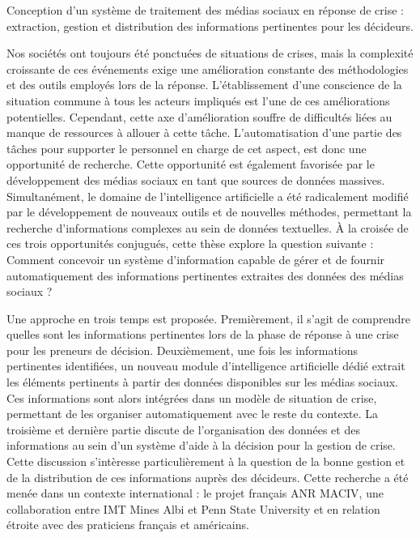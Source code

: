 \cleardoublepage
\pagestyle{empty}
\null
\newpage
{}%
{Conception d'un système de traitement des médias sociaux en réponse de crise : extraction, gestion et distribution des informations pertinentes pour les décideurs.}%
{
  Nos sociétés ont toujours été ponctuées de situations de crises, mais la complexité croissante de ces
  événements exige une amélioration constante des méthodologies et des outils employés lors de la réponse.
  L'établissement d'une conscience de la situation commune à tous les acteurs impliqués est l'une de ces améliorations
  potentielles.
  Cependant, cette axe d'amélioration souffre de difficultés liées au manque de ressources à allouer à cette tâche.
  L'automatisation d'une partie des tâches pour supporter le personnel en charge de cet aspect, est donc une opportunité de recherche.
  Cette opportunité est également favorisée par le développement des médias sociaux en tant que sources de données massives.
  Simultanément, le domaine de l'intelligence artificielle a été radicalement modifié par
  le développement de nouveaux outils et de nouvelles méthodes, permettant la recherche
  d'informations complexes au sein de données textuelles.
  À la croisée de ces trois opportunités conjugués, cette thèse explore la question suivante :
  Comment concevoir un système d'information capable de gérer et de fournir automatiquement
  des informations pertinentes extraites des données des médias sociaux ?

  Une approche en trois temps est proposée. Premièrement, il s'agit de comprendre
  quelles sont les informations pertinentes lors de la phase de réponse à une crise pour les preneurs de décision.
  Deuxièmement, une fois les informations pertinentes identifiées, un nouveau module d'intelligence
  artificielle dédié extrait les éléments pertinents à partir des données disponibles sur les médias sociaux.
  Ces informations sont alors intégrées dans un modèle de situation de crise, permettant
  de les organiser automatiquement avec le reste du contexte.
  La troisième et dernière partie discute de l'organisation des données et
  des informations au sein d'un système d'aide à la décision pour la gestion de crise.
  Cette discussion s'intèresse particulièrement à la question de la bonne gestion et de
  la distribution de ces informations auprès des décideurs.
  Cette recherche a été menée dans un contexte international : le projet français ANR
  MACIV, une collaboration entre IMT Mines Albi et Penn State University et en relation
  étroite avec des praticiens français et américains.

}
